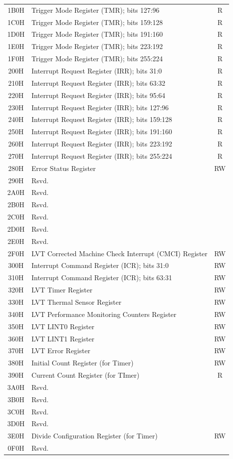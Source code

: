 \documentclass{article}
\begin{document}
\begin{longtable}{|c|l|c|}
  1B0H & Trigger Mode Register (TMR); bits 127:96 & R \\
  1C0H & Trigger Mode Register (TMR); bits 159:128 & R \\
  1D0H & Trigger Mode Register (TMR); bits 191:160 & R \\
  1E0H & Trigger Mode Register (TMR); bits 223:192 & R \\
  1F0H & Trigger Mode Register (TMR); bits 255:224 & R \\
  200H & Interrupt Request Register (IRR); bits 31:0 & R \\
  210H & Interrupt Request Register (IRR); bits 63:32 & R \\
  220H & Interrupt Request Register (IRR); bits 95:64 & R \\
  230H & Interrupt Request Register (IRR); bits 127:96 & R \\
  240H & Interrupt Request Register (IRR); bits 159:128 & R \\
  250H & Interrupt Request Register (IRR); bits 191:160 & R \\
  260H & Interrupt Request Register (IRR); bits 223:192 & R \\
  270H & Interrupt Request Register (IRR); bits 255:224 & R \\
  280H & Error Status Register & RW \\
  290H & Rsvd. & \\
  2A0H & Rsvd. & \\
  2B0H & Rsvd. & \\
  2C0H & Rsvd. & \\
  2D0H & Rsvd. & \\
  2E0H & Rsvd. & \\
  2F0H & LVT Corrected Machine Check Interrupt (CMCI) Register & RW \\
  300H & Interrupt Command Register (ICR); bits 31:0 & RW \\
  310H & Interrupt Command Register (ICR); bits 63:31 & RW \\
  320H & LVT Timer Register & RW \\
  330H & LVT Thermal Sensor Register & RW \\
  340H & LVT Performance Monitoring Counters Register & RW \\
  350H & LVT LINT0 Register & RW \\
  360H & LVT LINT1 Register & RW \\
  370H & LVT Error Register & RW \\
  380H & Initial Count Register (for Timer) & RW \\
  390H & Current Count Register (for TImer) & R \\
  3A0H & Rsvd. & \\
  3B0H & Rsvd. & \\
  3C0H & Rsvd. & \\
  3D0H & Rsvd. & \\
  3E0H & Divide Configuration Register (for Timer) & RW \\
  0F0H & Rsvd. & \\
\end{longtable}
\end{document}
